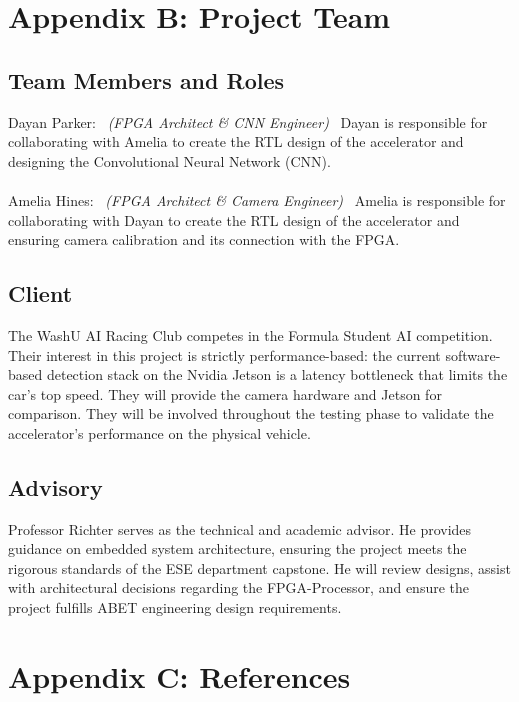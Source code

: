\documentclass[11pt,a4paper,twoside]{article}
\begin{document}
\section{Appendix B: Project Team}

\subsection{Team Members and Roles}

Dayan Parker: \ \textit{(FPGA Architect \& CNN Engineer)} \ Dayan is responsible for collaborating with Amelia to create the RTL design of the accelerator and designing the Convolutional Neural Network (CNN).
\\
\\
Amelia Hines: \ \textit{(FPGA Architect \& Camera Engineer)} \ Amelia is responsible for collaborating with Dayan to create the RTL design of the accelerator and ensuring camera calibration and its connection with the FPGA.

\subsection{Client}

The WashU AI Racing Club competes in the Formula Student AI competition. Their interest in this project is strictly performance-based: the current software-based detection stack on the Nvidia Jetson is a latency bottleneck that limits the car's top speed. They will provide the camera hardware and Jetson for comparison. They will be involved throughout the testing phase to validate the accelerator's performance on the physical vehicle.

\subsection{Advisory}
 
Professor Richter serves as the technical and academic advisor. He provides guidance on embedded system architecture, ensuring the project meets the rigorous standards of the ESE department capstone. He will review designs, assist with architectural decisions regarding the FPGA-Processor, and ensure the project fulfills ABET engineering design requirements.


\section{Appendix C: References}
\end{document}
